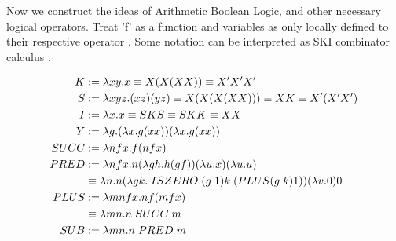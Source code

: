 Now we construct the ideas of Arithmetic Boolean Logic, and other necessary logical operators.
Treat 'f' as a function and variables as only locally defined to their respective operator \cite{LambdaFuncsList}.
Some notation can be interpreted as SKI combinator calculus \cite{SKICalcWiki}.

\[
    \begin{aligned}
        K &:= \lambda xy. x \equiv X(X (X X)) \equiv X' X' X'\\
        S &:= \lambda xyz. (x z) (y z) \equiv X (X (X (X X))) \equiv X K \equiv X' (X' X')\\
        I &:= \lambda x. x \equiv S K S \equiv S K K \equiv X X\\
        Y &:= \lambda g. (\lambda x. g (x x)) (\lambda x. g (x x))\\
        SUCC &:= \lambda nfx. f (n f x)\\
        PRED &:= \lambda n fx. n (\lambda gh. h(g f)) (\lambda u. x) (\lambda u. u)\\
            &\equiv \lambda n. n (\lambda gk. \hspace{0.1cm} ISZERO \hspace{0.1cm} (g \hspace{0.1cm} 1) k \hspace{0.1cm} (PLUS (g \hspace{0.1cm}k) 1))  (\lambda v. 0) 0\\
        PLUS &:= \lambda mnfx. n f (m f x)\\
            &\equiv \lambda mn. n \hspace{0.1cm} SUCC \hspace{0.1cm} m\\
        SUB &:= \lambda mn. n \hspace{0.1cm} PRED \hspace{0.1cm} m\\
    \end{aligned}
\]

